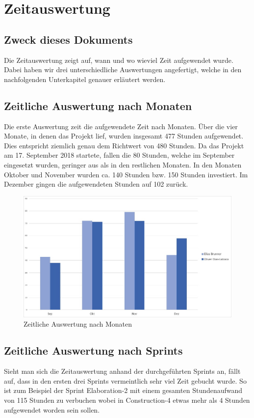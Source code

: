 \section{Zeitauswertung}

\subsection{Zweck dieses Dokuments}
Die Zeitauswertung zeigt auf, wann und wo wieviel Zeit aufgewendet wurde. Dabei haben wir drei unterschiedliche Auswertungen angefertigt, welche in den nachfolgenden Unterkapitel genauer erläutert werden.

\subsection{Zeitliche Auswertung nach Monaten}
Die erste Auswertung zeit die aufgewendete Zeit nach Monaten. 
Über die vier Monate, in denen das Projekt lief, wurden insgesamt 477 Stunden aufgewendet. Dies entspricht ziemlich genau dem Richtwert von 480 Stunden. 
Da das Projekt am 17. September 2018 startete, fallen die 80 Stunden, welche im September eingesetzt wurden, geringer aus als in den restlichen Monaten. In den Monaten Oktober und November wurden ca. 140 Stunden bzw. 150 Stunden investiert. Im Dezember gingen die aufgewendeten Stunden auf 102 zurück.

\begin{figure}[h]
  \centering
  \includegraphics[width=1\linewidth]{./img/zeitauswertung/ZeitauswertungMonate}
  \caption{Zeitliche Auswertung nach Monaten}
  \label{fig:comparison-month}
\end{figure}

\subsection{Zeitliche Auswertung nach Sprints}
Sieht man sich die Zeitauswertung anhand der durchgeführten Sprints an, fällt auf, dass in den ersten drei Sprints vermeintlich sehr viel Zeit gebucht wurde. So ist zum Beispiel der Sprint \grqq Elaboration-2\grqq{} mit einem gesamten Stundenaufwand von 115 Stunden zu verbuchen wobei in \grqq Construction-4\grqq{} etwas mehr als 4 Stunden aufgewendet worden sein sollen.

